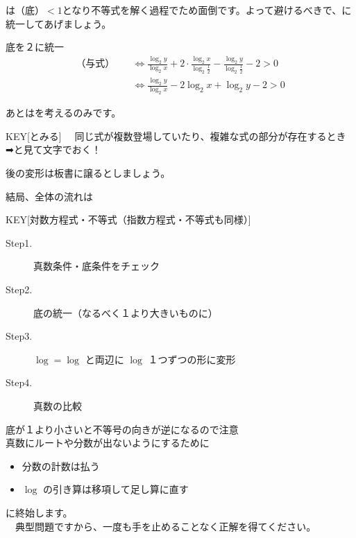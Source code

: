 \documentclass[8pt,b5paper,twoside]{ltjsreport}
\begin{document}
\begin{multicols*}{2}
\tri {} は$（底）< 1$となり不等式を解く過程でため面倒です。よって避けるべきで、に統一してあげましょう。

\begin{ascolorbox10}{底を$２$に統一}
  \begin{align*}
  \text{（与式）} \quad 
  &\Leftrightarrow \frac{\log_2 y}{\log_2 x} 
  + 2 \cdot \frac{\log_2 x}{\log_2 \frac{1}{2}} 
  - \frac{\log_2 y}{\log_2 \frac{1}{2}} - 2 > 0 \\
  &\Leftrightarrow \frac{\log_2 y}{\log_2 x} 
  - 2 \log_2 x 
  + \log_2 y - 2 > 0
  \end{align*}
\end{ascolorbox10}

\tri あとはを考えるのみです。

\begin{ptbs}{KEY}[とみる]
  　同じ式が複数登場していたり、複雑な式の部分が存在するとき\\
  ➡︎と見て文字でおく！
\end{ptbs}

後の変形は板書に譲るとしましょう。

\tri 結局、全体の流れは

\begin{ptbs}{KEY}[対数方程式・不等式（指数方程式・不等式も同様）]
  \begin{description}
    \item[Step1.] 真数条件・底条件をチェック
    \item[Step2.] 底の統一（なるべく１より大きいものに）  
    \item[Step3.] $\log = \log$ と両辺に $\log$ １つずつの形に変形
    \item[Step4.] 真数の比較 
  \end{description}
   底が１より小さいと不等号の向きが逆になるので注意\\
   真数にルートや分数が出ないようにするために
  \begin{itemize}
    \item[\maru{1}] 分数の計数は払う
    \item[\maru{2}] $\log$ の引き算は移項して足し算に直す 
  \end{itemize}
\end{ptbs}
に終始します。\\
　典型問題ですから、一度も手を止めることなく正解を得てください。
\end{multicols*}


\notefill

\begin{ascolorbox14}{}
  \vspace*{6em}
\end{ascolorbox14}
\end{document}
